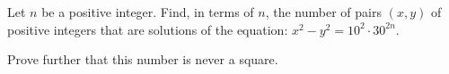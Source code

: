 \documentclass[varwidth]{standalone}
\begin{document}
    Let $n$ be a positive integer. Find, in terms of $n$, the number of pairs $(x, y)$ of positive integers that are solutions of the equation: $x^2 - y^2 = 10^2 \cdot 30^{2n}$.

    Prove further that this number is never a square.
\end{document}
